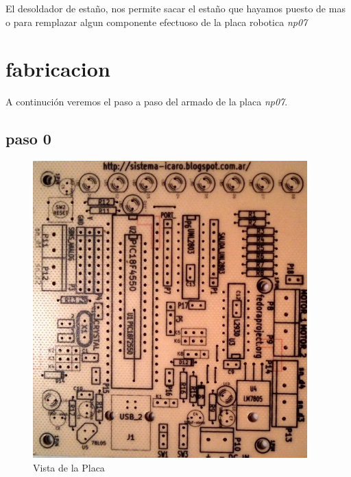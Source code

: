 \documentclass[letterpaper,10pt,english]{sphinxmanual}
\begin{document}
El desoldador de estaño, nos permite sacar el estaño que hayamos puesto
de mas o para remplazar algun componente efectuoso de la placa robotica \emph{np07}
\newpage

\section{fabricacion}
\label{np07:fabricacion}
A continución veremos el paso a paso del armado de la placa \emph{np07}.


\subsection{paso 0}
\label{np07:paso-0}\begin{figure}[htbp]
\centering
\capstart

\includegraphics[width=300pt]{0b.jpg}
\caption{Vista de la Placa}\end{figure}
\newpage
\end{document}
